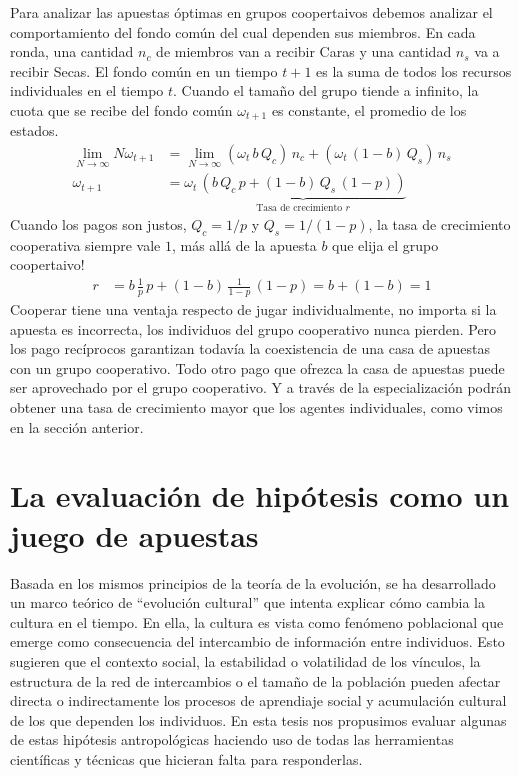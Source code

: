 \documentclass[a4paper,10pt]{book}
\theoremstyle{definition}
\begin{document}
Para analizar las apuestas óptimas en grupos coopertaivos debemos analizar el comportamiento del fondo común del cual dependen sus miembros.
%
En cada ronda, una cantidad $n_c$ de miembros van a recibir Caras y una cantidad $n_s$ va a recibir Secas.
%
El fondo común en un tiempo $t+1$ es la suma de todos los recursos individuales en el tiempo $t$.
%
Cuando el tamaño del grupo tiende a infinito, la cuota que se recibe del fondo común $\omega_{t+1}$ es constante, el promedio de los estados.
%
\begin{equation}
\begin{split}
\lim_{N \rightarrow \infty} N \omega_{t+1} &= \lim_{N \rightarrow \infty} (\omega_t \, b \, Q_c ) \, n_c + (\omega_t \, (1-b) \, Q_s ) \, n_s \\
 \omega_{t+1} &=  \omega_t \, \underbrace{\left(  b \, Q_c \, p +  (1-b) \, Q_s \, (1-p) \right)}_{\text{Tasa de crecimiento } r} 
\end{split}
\end{equation}
%
Cuando los pagos son justos, $Q_c = 1/p$ y $Q_s = 1/(1-p)$, la tasa de crecimiento cooperativa siempre vale $1$, más allá de la apuesta $b$ que elija el grupo coopertaivo!
%
\begin{equation}
\begin{split}
r &=  b \, \frac{1}{p} \, p +  (1-b) \, \frac{1}{1-p} \, (1-p) = b + (1 - b) = 1
\end{split}
\end{equation}
%
Cooperar tiene una ventaja respecto de jugar individualmente, no importa si la apuesta es incorrecta, los individuos del grupo cooperativo nunca pierden.
%
Pero los pago recíprocos garantizan todavía la coexistencia de una casa de apuestas con un grupo cooperativo.
%
Todo otro pago que ofrezca la casa de apuestas puede ser aprovechado por el grupo cooperativo.
%
Y a través de la especialización podrán obtener una tasa de crecimiento mayor que los agentes individuales, como vimos en la sección anterior.

\section{La evaluación de hipótesis como un juego de apuestas}

Basada en los mismos principios de la teoría de la evolución, se ha desarrollado un marco teórico de ``evolución cultural'' que intenta explicar cómo cambia la cultura en el tiempo.
%
En ella, la cultura es vista como fenómeno poblacional que emerge como consecuencia del intercambio de información entre individuos.
%
Esto sugieren que el contexto social, la estabilidad o volatilidad de los vínculos, la estructura de la red de intercambios o el tamaño de la población pueden afectar directa o indirectamente los procesos de aprendiaje social y acumulación cultural de los que dependen los individuos.
%
En esta tesis nos propusimos evaluar algunas de estas hipótesis antropológicas haciendo uso de todas las herramientas científicas y técnicas que hicieran falta para responderlas.
\end{document}

